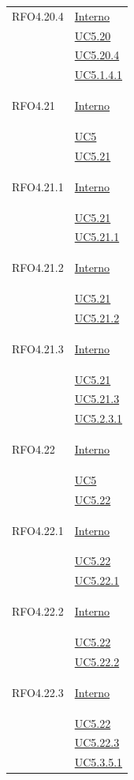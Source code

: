 \begin{longtable}{|>{\centering}m{5cm}|m{5cm}<{\centering}|}
\hypertarget{RFO4.20.4}{RFO4.20.4} & \hyperlink{Interno}{Interno}\\
&\hyperref[UC5.20]{UC5.20}\\
&\hyperref[UC5.20.4]{UC5.20.4}\\ 
&\hyperref[UC5.1.4.1]{UC5.1.4.1}\\ \hline

\hypertarget{RFO4.21}{RFO4.21} & \hyperlink{Interno}{Interno}\\
&\hyperref[UC5]{UC5}\\
&\hyperref[UC5.21]{UC5.21}\\ \hline

\hypertarget{RFO4.21.1}{RFO4.21.1} & \hyperlink{Interno}{Interno}\\
&\hyperref[UC5.21]{UC5.21}\\
&\hyperref[UC5.21.1]{UC5.21.1}\\ \hline

\hypertarget{RFO4.21.2}{RFO4.21.2} & \hyperlink{Interno}{Interno}\\
&\hyperref[UC5.21]{UC5.21}\\
&\hyperref[UC5.21.2]{UC5.21.2}\\ \hline

\hypertarget{RFO4.21.3}{RFO4.21.3} & \hyperlink{Interno}{Interno}\\
&\hyperref[UC5.21]{UC5.21}\\
&\hyperref[UC5.21.3]{UC5.21.3}\\
&\hyperref[UC5.2.3.1]{UC5.2.3.1}\\ \hline

\hypertarget{RFO4.22}{RFO4.22} & \hyperlink{Interno}{Interno}\\
&\hyperref[UC5]{UC5}\\
&\hyperref[UC5.22]{UC5.22}\\ \hline

\hypertarget{RFO4.22.1}{RFO4.22.1} &   \hyperlink{Interno}{Interno}\\
&\hyperref[UC5.22]{UC5.22}\\
&\hyperref[UC5.22.1]{UC5.22.1}\\ \hline

\hypertarget{RFO4.22.2}{RFO4.22.2} & \hyperlink{Interno}{Interno}\\
&\hyperref[UC5.22]{UC5.22}\\
&\hyperref[UC5.22.2]{UC5.22.2}\\ \hline

\hypertarget{RFO4.22.3}{RFO4.22.3} &\hyperlink{Interno}{Interno}\\
&\hyperref[UC5.22]{UC5.22}\\
&\hyperref[UC5.22.3]{UC5.22.3}\\
&\hyperref[UC5.3.5.1]{UC5.3.5.1}\\ \hline


\end{longtable}

